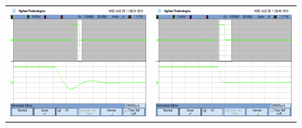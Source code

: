 \begin{figure}[H]
	\centering
	\begin{tabular}{c c}
		\includegraphics[scale=0.2]{Derivador/Mediciones/Osciloscopio/PCB_Compensado/Calibracion/scope_19.png} &
		\includegraphics[scale=0.2]{Derivador/Mediciones/Osciloscopio/PCB_Compensado/Calibracion/scope_21.png}
	\end{tabular}

\end{figure}
